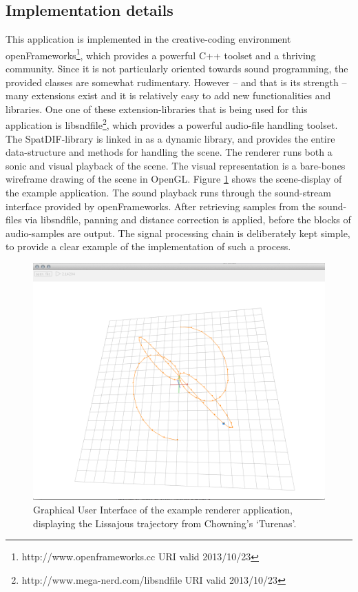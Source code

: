 \documentclass[a4paper]{article}
\begin{document}
\subsection{Implementation details}

This application is implemented in the creative-coding environment openFrameworks\footnote{http://www.openframeworks.cc URI valid 2013/10/23}, which provides a powerful C++ toolset and a thriving community.
Since it is not particularly oriented towards sound programming, the provided classes are somewhat rudimentary.
However -- and that is its strength -- many extensions exist and it is relatively easy to add new functionalities and libraries.
One one of these extension-libraries that is being used for this application is libsndfile\footnote{http://www.mega-nerd.com/libsndfile URI valid 2013/10/23}, which provides a powerful audio-file handling toolset.
The SpatDIF-library is linked in as a dynamic library, and provides the entire data-structure and methods for handling the scene.
The renderer runs both a sonic and visual playback of the scene.
The visual representation is a bare-bones wireframe drawing of the scene in OpenGL.
Figure \ref{fig:screenshot} shows the scene-display of the example application.
The sound playback runs through the sound-stream interface provided by openFrameworks.
After retrieving samples from the sound-files via libsndfile, panning and distance correction is applied, before the blocks of audio-samples are output.
The signal processing chain is deliberately kept simple, to provide a clear example of the implementation of such a process.

\begin{figure}[h]
\centerline{
	\includegraphics[width=\columnwidth]{SpatDIFrenderer_screenshot2}}
\caption{Graphical User Interface of the example renderer application, displaying the Lissajous trajectory from Chowning's `Turenas'. 
}
\label{fig:screenshot}
\end{figure}
\end{document}
